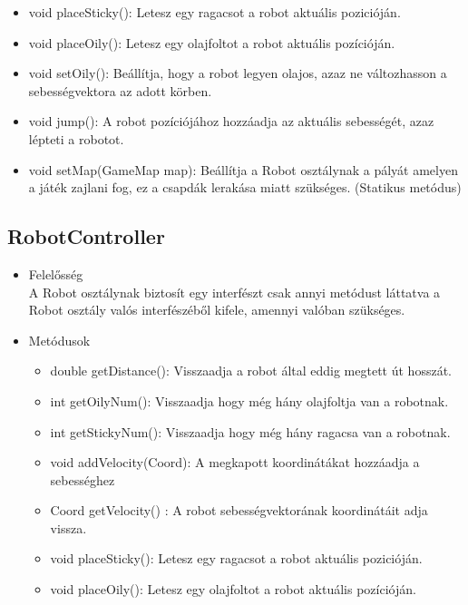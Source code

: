 \begin{itemize}
\begin{itemize}
		\item void placeSticky(): Letesz egy ragacsot a robot aktuális pozicióján.
		\item void placeOily(): Letesz egy olajfoltot a robot aktuális pozícióján.
		\item void setOily(): Beállítja, hogy a robot legyen olajos, azaz ne változhasson a sebességvektora az adott körben.
		\item void jump(): A robot pozíciójához hozzáadja az aktuális sebességét, azaz lépteti a robotot.
		\item void setMap(GameMap map): Beállítja a Robot osztálynak a pályát amelyen a játék zajlani fog, ez a csapdák lerakása miatt szükséges. (Statikus metódus)
	\end{itemize}
\end{itemize}

\subsection{RobotController}
\begin{itemize}
	\item Felelősség\\
	A Robot osztálynak biztosít egy interfészt csak annyi metódust láttatva a Robot osztály valós interfészéből kifele, amennyi valóban szükséges.
	\item Metódusok
	\begin{itemize}
		\item double getDistance(): Visszaadja a robot által eddig megtett út hosszát.
		\item int getOilyNum(): Visszaadja hogy még hány olajfoltja van a robotnak.
		\item int getStickyNum(): Visszaadja hogy még hány ragacsa van a robotnak.
		\item void addVelocity(Coord): A megkapott koordinátákat hozzáadja a sebességhez
		\item Coord getVelocity() : A robot sebességvektorának koordinátáit adja vissza.
		\item void placeSticky(): Letesz egy ragacsot a robot aktuális pozicióján.
		\item void placeOily(): Letesz egy olajfoltot a robot aktuális pozícióján.
	\end{itemize}
\end{itemize}

